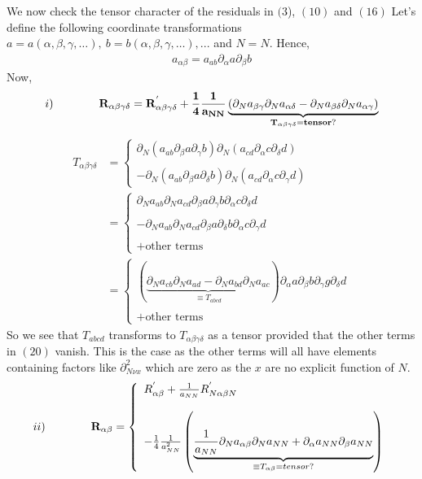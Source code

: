 We now check the tensor character of the residuals in $(3$), $(10)$ and $(16)$
Let's define the following coordinate transformations 
$a=a(\alpha,\beta,\gamma,\dots), \ b=b(\alpha,\beta,\gamma,\dots),...$ and $N = N$.
Hence,
\begin{align}
a_{\alpha\beta}= a_{ab}\partial_\alpha a \partial_\beta b
\end{align}
Now,
$$i)\quad\quad\quad\quad \mathbf{R_{\alpha\beta\gamma\delta}= R^{'}_{\alpha\beta\gamma\delta}+ \frac{1}{4}\frac{1}{a_{NN}}\underbrace{\left(\partial_N a_{\beta\gamma} \partial_N a_{\alpha\delta}-\partial_N a_{\beta\delta} \partial_N a_{\alpha\gamma}\right)}_{T_{\alpha\beta\gamma\delta}=tensor?}}$$
\begin{align}
T_{\alpha\beta\gamma\delta}&=\left\{\begin{array}{l}\partial_N\left( a_{ab}\partial_\beta a \partial_\gamma b\right)\partial_N\left( a_{cd}\partial_\alpha c \partial_\delta d\right)\\\\
-\partial_N \left(a_{ab}\partial_\beta a \partial_\delta b \right)\partial_N\left(a_{cd}\partial_\alpha c \partial_\gamma d\right)
\end{array}\right.\\
&=\left\{\begin{array}{l}
\partial_N a_{ab}\partial_N a_{cd}\partial_\beta a \partial_\gamma b\partial_\alpha c \partial_\delta d\\\\
-\partial_N a_{ab}\partial_N a_{cd}\partial_\beta a \partial_\delta b \partial_\alpha c \partial_\gamma d\\\\
+\text{other terms}
\end{array}\right.\\
&=\left\{\begin{array}{l}
\left(\underbrace{\partial_N a_{cb}\partial_N a_{ad}
-\partial_N a_{bd}\partial_N a_{ac}}_{\equiv T_{abcd}}\right)\partial_\alpha a\partial_\beta b \partial_\gamma g \partial_\delta d\\\\
+\text{other terms}
\end{array}\right.
\end{align}
So we see that $T_{abcd}$ transforms to $T_{\alpha\beta\gamma\delta}$ as a tensor provided that the other terms in $(20)$ vanish. This is the case as the other terms will all have elements containing factors like $\partial^2_{N\nu x}$ which are zero as the $x$ are no explicit function of $N$.
$$ii)\quad\quad\quad\quad \mathbf{R_{\alpha\beta} =\left\{\begin{array}{l}R^{'}_{\alpha\beta} + \frac{1}{a_{NN}}R^{'}_{N \alpha\beta N} \\\\ -\frac{1}{4}\frac{1}{a_{NN}^2}\left(\underbrace{ \frac{1}{a_{NN}}\partial_N a_{\alpha\beta}\partial_N a_{NN}+\partial_{\alpha} a_{NN}\partial_{\beta} a_{NN}}_{\equiv T_{\alpha\beta} = tensor?}\right)\end{array}\right.}$$
